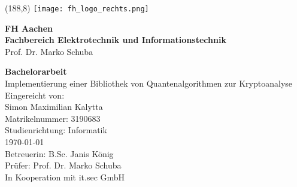 \begin{titlepage}

\thispagestyle{empty}%
\setlength{\oddsidemargin}{0cm}%
\enlargethispage{\baselineskip}
\begin{textblock}{16}(188,8)%
    \texttt{[image: fh\_logo\_rechts.png]}%
 \end{textblock}%
\vspace*{-1.0cm}
\LARGE\textbf{FH Aachen}\\
\Large\textbf{Fachbereich Elektrotechnik und Informationstechnik}\\
\large Prof. Dr. Marko Schuba
\vspace{2cm}
\begin{center}
	\LARGE\textbf{Bachelorarbeit}\\
	\vspace{1.75cm}
	\LARGE Implementierung einer Bibliothek von Quantenalgorithmen zur Kryptoanalyse\\
	\large
	\vspace{2.5cm}
	Eingereicht von:\\
	Simon Maximilian Kalytta\\
	Matrikelnummer: 3190683\\
	\vspace{1cm}
	Studienrichtung: Informatik\\
	\vspace{1cm}
	\today\\
	\vspace{1.5cm}
	Betreuerin: B.Sc. Janis König\\
	Prüfer: Prof. Dr. Marko Schuba\\
        \vspace{0.5cm}
        In Kooperation mit it.sec GmbH
\end{center}
\end{titlepage}